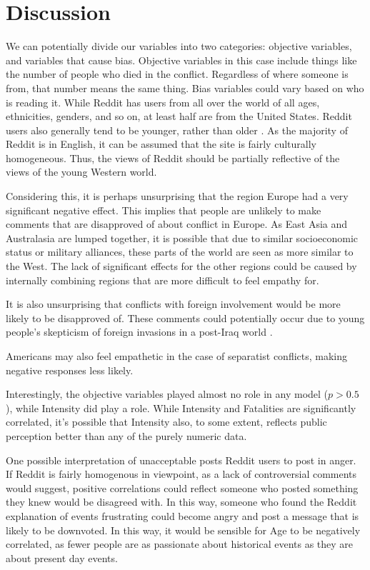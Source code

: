 \section{Discussion}
We can potentially divide our variables into two categories: objective variables, and variables that cause bias. Objective variables in this case include things like the number of people who died in the conflict. Regardless of where someone is from, that number means the same thing. Bias variables could vary based on who is reading it. While Reddit has users from all over the world of all ages, ethnicities, genders, and so on, at least half are from the United States\cite{reddit-demo}. Reddit users also generally tend to be younger, rather than older \cite{pewinternet}. As the majority of Reddit is in English, it can be assumed that the site is fairly culturally homogeneous. Thus, the views of Reddit should be partially reflective of the views of the young Western world.

Considering this, it is perhaps unsurprising that the region Europe had a very significant negative effect. This implies that people are unlikely to make comments that are disapproved of about conflict in Europe. As East Asia and Australasia are lumped together, it is possible that due to similar socioeconomic status or military alliances, these parts of the world are seen as more similar to the West. The lack of significant effects for the other regions could be caused by internally combining regions that are more difficult to feel empathy for.

It is also unsurprising that conflicts with foreign involvement would be more likely to be disapproved of. These comments could potentially occur due to young people's skepticism of foreign invasions in a post-Iraq world \cite{cato}. 

Americans may also feel empathetic in the case of separatist conflicts, making negative responses less likely.

Interestingly, the objective variables played almost no role in any model ($p > 0.5$), while Intensity did play a role. While Intensity and Fatalities are significantly correlated, it's possible that Intensity also, to some extent, reflects public perception better than any of the purely numeric data. 

One possible interpretation of unacceptable posts  Reddit users to post in anger. If Reddit is fairly homogenous in viewpoint, as a lack of controversial comments would suggest, positive correlations could reflect someone who posted something they knew would be disagreed with. In this way, someone who found the Reddit explanation of events frustrating could become angry and post a message that is likely to be downvoted. In this way, it would be sensible for Age to be negatively correlated, as fewer people are as passionate about historical events as they are about present day events.